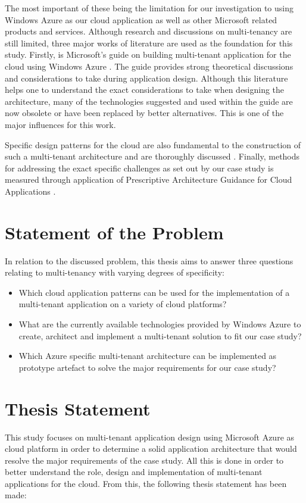 The most important of these being the limitation for our investigation to using Windows Azure as our cloud application as well as other Microsoft related products and services. Although research and discussions on multi-tenancy are still limited, three major works of literature are used as the foundation for this study. Firstly, is Microsoft's guide on building multi-tenant application for the cloud using Windows Azure \cite{Betts2012-ad}. The guide provides strong theoretical discussions and considerations to take during application design. Although this literature helps one to understand the exact considerations to take when designing the architecture, many of the technologies suggested and used within the guide are now obsolete or have been replaced by better alternatives. This is one of the major influences for this work.

Specific design patterns for the cloud are also fundamental to the construction of such a multi-tenant architecture and are thoroughly discussed \cite{Wilder2012-so}. Finally, methods for addressing the exact specific challenges as set out by our case study is measured through application of Prescriptive Architecture Guidance for Cloud Applications \cite{Homer2014}. 

\section{Statement of the Problem}
In relation to the discussed problem, this thesis aims to answer three questions relating to multi-tenancy with varying degrees of specificity:
\begin{itemize}
\item Which cloud application patterns can be used for the implementation of a multi-tenant application on a variety of cloud platforms?
\item What are the currently available technologies provided by Windows Azure to create, architect and implement a multi-tenant solution to fit our case study?
\item Which Azure specific multi-tenant architecture can be implemented as prototype  artefact to solve the major requirements for our case study?
\end{itemize}

\section{Thesis Statement}
This study focuses on multi-tenant application design using Microsoft Azure as cloud platform in order to determine a solid application architecture that would resolve the major requirements of the case study. All this is done in order to better understand the role, design and implementation of multi-tenant applications for the cloud. From this, the following thesis statement has been made:
 
